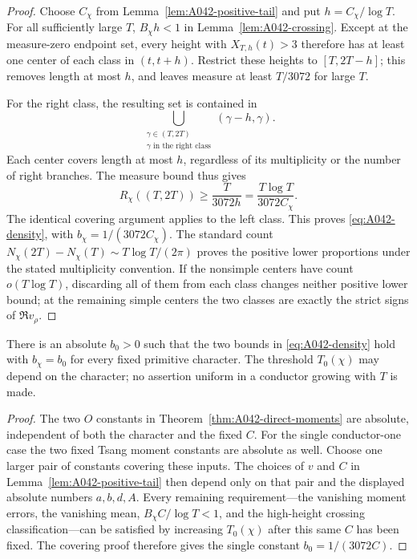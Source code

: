 \begin{proof}
Choose $C_\chi$ from Lemma~\ref{lem:A042-positive-tail} and
put $h=C_\chi/\log T$. For all sufficiently large $T$,
$B_\chi h<1$ in Lemma~\ref{lem:A042-crossing}.
Except at the measure-zero endpoint set, every height with
$X_{T,h}(t)>3$ therefore has at least one center of each
class in $(t,t+h)$. Restrict these heights to
$[T,2T-h]$; this removes length at most $h$, and leaves
measure at least $T/3072$ for large $T$.

For the right class, the resulting set is contained in
\[
       \bigcup_{\substack{\gamma\in(T,2T)\\\gamma\text{ in the right class}}}
                         (\gamma-h,\gamma).
\]
Each center covers length at most $h$, regardless of its
multiplicity or the number of right branches. The measure
bound thus gives
\[
 R_\chi((T,2T))\ge\frac{T}{3072h}
                         =\frac{T\log T}{3072C_\chi}.
\]
The identical covering argument applies to the left class.
This proves \eqref{eq:A042-density}, with
$b_\chi=1/(3072C_\chi)$. The standard count
$N_\chi(2T)-N_\chi(T)\sim T\log T/(2\pi)$ proves the
positive lower proportions under the stated multiplicity
convention. If the nonsimple centers have count $o(T\log T)$,
discarding all of them from each class changes neither positive
lower bound; at the remaining simple centers the two classes
are exactly the strict signs of $\Re v_\rho$.
\end{proof}

\begin{corollary}
There is an absolute $b_0>0$ such that the two bounds in
\eqref{eq:A042-density} hold with $b_\chi=b_0$ for every fixed
primitive character. The threshold $T_0(\chi)$ may depend on
the character; no assertion uniform in a conductor growing
with $T$ is made.
\end{corollary}

\begin{proof}
The two $O$ constants in Theorem~\ref{thm:A042-direct-moments}
are absolute, independent of both the character and the fixed
$C$. For the single conductor-one case the two fixed Tsang
moment constants are absolute as well. Choose one larger pair
of constants covering these inputs. The choices of $v$ and
$C$ in Lemma~\ref{lem:A042-positive-tail} then depend only on
that pair and the displayed absolute numbers $a,b,d,A$.
Every remaining requirement---the vanishing moment errors,
the vanishing mean, $B_\chi C/\log T<1$, and the high-height
crossing classification---can be satisfied by increasing
$T_0(\chi)$ after this same $C$ has been fixed. The covering
proof therefore gives the single constant $b_0=1/(3072C)$.
\end{proof}

